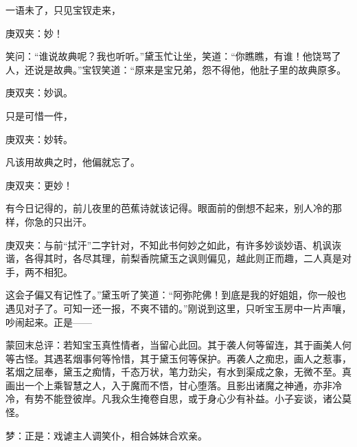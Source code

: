 \begin{parag}
    一语未了，只见宝钗走来，\begin{note}庚双夹：妙！\end{note}笑问：“谁说故典呢？我也听听。”黛玉忙让坐，笑道：“你瞧瞧，有谁！他饶骂了人，还说是故典。”宝钗笑道：“原来是宝兄弟，怨不得他，他肚子里的故典原多。\begin{note}庚双夹：妙讽。\end{note}只是可惜一件，\begin{note}庚双夹：妙转。\end{note}凡该用故典之时，他偏就忘了。\begin{note}庚双夹：更妙！\end{note}有今日记得的，前儿夜里的芭蕉诗就该记得。眼面前的倒想不起来，别人冷的那样，你急的只出汗。\begin{note}庚双夹：与前“拭汗”二字针对，不知此书何妙之如此，有许多妙谈妙语、机讽诙谐，各得其时，各尽其理，前梨香院黛玉之讽则偏见，越此则正而趣，二人真是对手，两不相犯。\end{note}这会子偏又有记性了。”黛玉听了笑道：“阿弥陀佛！到底是我的好姐姐，你一般也遇见对子了。可知一还一报，不爽不错的。”刚说到这里，只听宝玉房中一片声嚷，吵闹起来。正是——
\end{parag}


\begin{parag}
    \begin{note}蒙回末总评：若知宝玉真性情者，当留心此回。其于袭人何等留连，其于画美人何等古怪。其遇茗烟事何等怜惜，其于黛玉何等保护。再袭人之痴忠，画人之惹事，茗烟之屈奉，黛玉之痴情，千态万状，笔力劲尖，有水到渠成之象，无微不至。真画出一个上乘智慧之人，入于魔而不悟，甘心堕落。且影出诸魔之神通，亦非冷冷，有势不能登彼岸。凡我众生掩卷自思，或于身心少有补益。小子妄谈，诸公莫怪。\end{note}
\end{parag}


\begin{parag}
    \begin{note}梦：正是：戏谑主人调笑仆，相合姊妹合欢亲。\end{note}
\end{parag}
